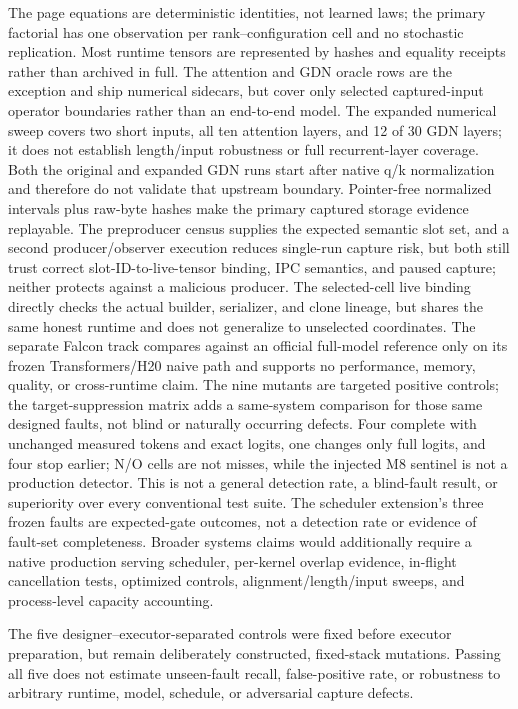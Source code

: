 \documentclass{article}
\begin{document}
The page equations are deterministic identities, not learned laws; the primary
factorial has one observation per rank--configuration cell and no stochastic
replication.
Most runtime tensors are represented by hashes and equality receipts rather
than archived in full.  The attention and GDN oracle rows are the exception
and ship numerical sidecars, but cover only selected captured-input operator
boundaries rather than an end-to-end model.  The expanded numerical sweep covers two
short inputs, all ten attention layers, and 12 of 30 GDN layers; it does not
establish length/input robustness or full recurrent-layer coverage.  Both the
original and expanded GDN runs start after native q/k normalization and
therefore do not validate that upstream boundary.  Pointer-free normalized
intervals plus raw-byte hashes make the primary captured storage evidence
replayable.  The preproducer census supplies the expected semantic slot set,
and a second producer/observer execution reduces single-run capture risk, but
both still trust correct slot-ID-to-live-tensor binding, IPC semantics, and paused
capture; neither protects against a malicious producer.  The selected-cell
live binding directly checks the actual builder, serializer, and clone lineage,
but shares the same honest runtime and does not generalize to unselected
coordinates.  The separate Falcon
track compares against an official full-model reference only on its frozen
Transformers/H20 naive path and supports no performance, memory, quality, or
cross-runtime claim.  The nine mutants are targeted
positive controls; the target-suppression matrix adds a same-system comparison
for those same designed faults, not blind or naturally occurring defects.
Four complete with unchanged measured tokens and exact logits, one changes only full logits,
and four stop earlier; N/O cells are not misses, while the injected M8 sentinel
is not a production detector.  This is not a general detection rate, a
blind-fault result, or superiority over every conventional test suite.  The scheduler
extension's three frozen faults are expected-gate outcomes, not a detection
rate or evidence of fault-set completeness.  Broader systems claims would
additionally require a native production serving scheduler, per-kernel overlap
evidence, in-flight cancellation tests, optimized controls,
alignment/length/input sweeps, and process-level capacity accounting.

The five designer--executor-separated controls were fixed before executor
preparation, but remain deliberately constructed, fixed-stack mutations.  Passing all five does
not estimate unseen-fault recall, false-positive rate, or robustness to arbitrary
runtime, model, schedule, or adversarial capture defects.
\end{document}
